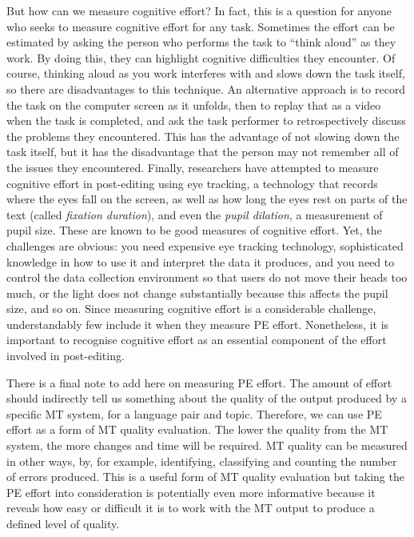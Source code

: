 \documentclass[output=paper,colorlinks,citecolor=brown]{langscibook}
\begin{document}
But how can we measure cognitive effort? In fact, this is a question for anyone who seeks to measure cognitive effort for any task. Sometimes the effort can be estimated by asking the person who performs the task to “think aloud” as they work. By doing this, they can highlight cognitive difficulties they encounter. Of course, thinking aloud as you work interferes with and slows down the task itself, so there are disadvantages to this technique. An alternative approach is to record the task on the computer screen as it unfolds, then to replay that as a video when the task is completed, and ask the task performer to retrospectively discuss the problems they encountered. This has the advantage of not slowing down the task itself, but it has the disadvantage that the person may not remember all of the issues they encountered. Finally, researchers have attempted to measure cognitive effort in post-editing using eye tracking, a technology that records where the eyes fall on the screen, as well as how long the eyes rest on parts of the text (called \textit{fixation duration}), and even the \textit{pupil dilation}, a measurement of pupil size. These are known to be good measures of cognitive effort. Yet, the challenges are obvious: you need expensive eye tracking technology, sophisticated knowledge in how to use it and interpret the data it produces, and you need to control the data collection environment so that users do not move their heads too much, or the light does not change substantially because this affects the pupil size, and so on. Since measuring cognitive effort is a considerable challenge, understandably few include it when they measure PE effort. Nonetheless, it is important to recognise cognitive effort as an essential component of the effort involved in post-editing.

There is a final note to add here on measuring PE effort. The amount of effort should indirectly tell us something about the quality of the output produced by a specific MT system, for a language pair and topic. Therefore, we can use PE effort as a form of MT quality evaluation. The lower the quality from the MT system, the more changes and time will be required. MT quality can be measured in other ways, by, for example, identifying, classifying and counting the number of errors produced. This is a useful form of MT quality evaluation but taking the PE effort into consideration is potentially even more informative because it reveals how easy or difficult it is to work with the MT output to produce a defined level of quality.
\end{document}
